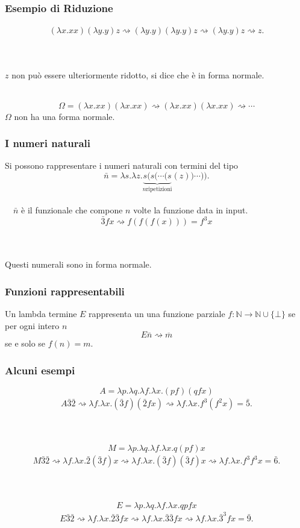 \documentclass[aspectratio=43]{beamer}
\renewcommand{\l}{\lambda}
\newcommand{\conv}{\rightsquigarrow}
\begin{document}
\begin{frame}
    \frametitle{Esempio di Riduzione}
    \begin{align*}
        (\l x.xx)(\l y.y)z \conv (\l y.y)(\l y.y)z 
        \conv (\l y.y)z \conv z.
    \end{align*}
    \\~\

    $z$ non pu\`o essere ulteriormente ridotto, si dice che \`e in forma
    normale.
    \\~\

    \[
        \Omega = (\l x.xx)(\l x.xx) \conv (\l x.xx)(\l x.xx) \conv\cdots
    \]
    $\Omega$ non ha una forma normale.
\end{frame}

\begin{frame}
    \frametitle{I numeri naturali}

    Si possono rappresentare i numeri naturali con termini del tipo
    \[
        \bar{n} = \l s. \l z. \underbrace{s ( s ( \cdots (s}_{n\text{
            ripetizioni}} (z))\cdots )).
    \]
    \\~\
    $\bar{n}$ \`e il funzionale che compone $n$ volte la funzione data in input.
    \[
        \bar{3} f x \conv f(f(f(x))) = f^3x
    \]
    \\~\

    Questi numerali sono in forma normale.
\end{frame}

\begin{frame}
    \frametitle{Funzioni rappresentabili}

    Un lambda termine $E$ rappresenta un una funzione parziale ${f\colon
    \mathbb{N}\rightarrow \mathbb{N}\cup \{\bot\} }$ se per ogni intero $n$
    \[
        E\bar{n}\conv \overline{m}
    \]
    se e solo se $f(n)=m$.
\end{frame}

\begin{frame}
    \frametitle{Alcuni esempi} 

    \[
        A = \l p. \l q. \l f. \l x. (pf)(qfx)
    \]
    \begin{align*}
        A \bar{3} \bar{2} \conv \l f. \l x. (\bar{3}f)(\bar{2}fx)
        \conv \l f. \l x. f^3(f^2x) = \bar{5}.
    \end{align*}
    \\~\

    \[
        M = \l p. \l q. \l f. \l x. q(pf)x
    \]
    \begin{align*}
        M \bar{3} \bar{2} \conv \l f. \l x. \bar{2} (\bar{3}f)x
        \conv \l f. \l x. (\bar{3}f)(\bar{3}f)x \conv \l f. \l x.f^3f^3x =
        \bar{6}.
    \end{align*}
    \\~\

    \[
        E = \l p. \l q. \l f. \l x. qpfx
    \]
    \begin{align*}
        E \bar{3} \bar{2} \conv \l f. \l x. \bar{2} \bar{3}fx
        \conv \l f. \l x. \bar{3}\bar{3}fx \conv \l f. \l x. \bar{3}^3 fx =
        \bar{9}.
    \end{align*}
\end{frame}
\end{document}
